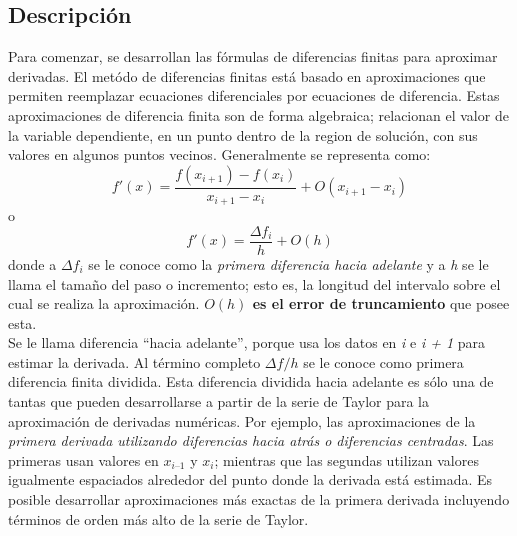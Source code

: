 \documentclass[journal,transmag]{IEEEtran}
\theoremstyle{mytheoremstyle}
\theoremstyle{mytheoremstyle}
\theoremstyle{myproblemstyle}
\begin{document}
\subsection{Descripción}
Para comenzar, se desarrollan las fórmulas de diferencias finitas para aproximar derivadas. El metódo de
diferencias finitas está basado en aproximaciones que permiten reemplazar ecuaciones diferenciales por ecuaciones de diferencia.
Estas aproximaciones de diferencia finita son de forma algebraica; relacionan el valor de la variable dependiente, en un punto dentro de la region de solución, con sus valores en algunos 
puntos vecinos. Generalmente se representa como:
\begin{equation}
    {f'(x)} = \frac{f(x_{i+1}) - f(x_i)}{x_{i+1} - x_i} + O(x_{i+1} - x_i)
\end{equation}
o
\begin{equation}
    {f'(x)} = \frac{\Delta f_i}{h} + O(h)
\end{equation}
    donde a $\Delta f_i$ se le conoce como la \textit{primera diferencia hacia adelante} y a \textit{h} se le llama el tamaño del paso o incremento; esto es, la longitud del intervalo sobre el cual se realiza la aproximación. \textbf{$O(h)$ es el error de truncamiento} que posee esta.\\
    
    Se le llama diferencia “hacia adelante”, porque usa los datos en \textit{i} e \textit{i + 1} para estimar la derivada.  Al término completo $\Delta f/h$ se le conoce como primera diferencia finita dividida. Esta diferencia dividida hacia adelante es sólo una de tantas que pueden desarrollarse a partir de la serie de Taylor para la aproximación de derivadas numéricas. Por ejemplo, las aproximaciones de la \textit{primera derivada utilizando diferencias hacia atrás o diferencias centradas}. Las primeras usan valores en $x_{i–1}$ y $x_i$; mientras que las segundas utilizan valores igualmente espaciados alrededor del punto donde la derivada está estimada. Es posible desarrollar aproximaciones más exactas de la primera derivada incluyendo términos de orden más alto de la serie de Taylor.\\
    
\end{document}
